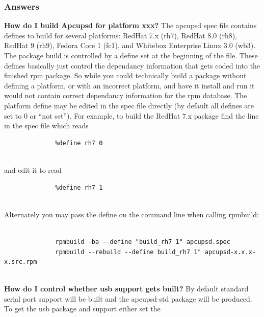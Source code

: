{{{{{{{{{{{{{{{{{\label{Answers}

\subsubsection*{Answers}

\begin{description}

\item {\bf {\bf How do I build Apcupsd for platform xxx?}}
The apcupsd spec file contains defines to build for several platforms: RedHat
7.x (rh7), RedHat 8.0 (rh8), RedHat 9 (rh9), Fedora Core 1 (fc1), and Whitebox
Enterprise Linux 3.0 (wb3).  The package build is controlled by a define set
at the beginning of the file. These defines basically just control the
dependancy information that gets coded into the finished rpm package.  So
while you could technically build a package without defining a platform, or
with an incorrect platform, and have it install and run it would not contain
correct dependancy information for the rpm database.  The platform define may
be edited in the spec file directly (by default all defines are set to 0 or
``not set'').  For example, to build the RedHat 7.x package find the line in
the spec file which reads  

\footnotesize
\begin{verbatim}
              %define rh7 0
     
\end{verbatim}
\normalsize

and edit it to read  

\footnotesize
\begin{verbatim}
              %define rh7 1
     
\end{verbatim}
\normalsize

Alternately you may pass the define on the command line when calling rpmbuild:
 

\footnotesize
\begin{verbatim}
          
              rpmbuild -ba --define "build_rh7 1" apcupsd.spec
              rpmbuild --rebuild --define build_rh7 1" apcupsd-x.x.x-x.src.rpm
     
\end{verbatim}
\normalsize


\item {\bf {\bf How do I control whether usb support gets built?}}
By default standard serial port support will be built and the apcupsd-std
package will be produced. To get the usb package and support either set the  


\end{description}}}}}}}}}}}}}}}}}}
